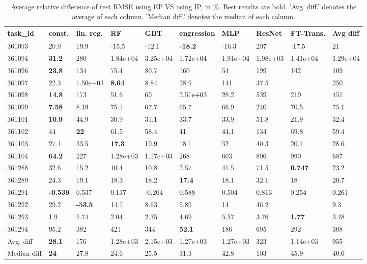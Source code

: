 \begin{table}[ht!]
\centering
\begingroup\footnotesize
\begin{tabular}{llllllllll}
  \hline
\hline
task\_id & const. & lin. reg. & RF & GBT & engression & MLP & ResNet & FT-Trans. & Avg diff \\ 
  \hline
361093 & 20.9 & 19.9 & -15.5 & -12.1 & \textbf{-18.2} & -16.3 & 207 & -17.5 & 21 \\ 
  361094 & \textbf{31.2} & 280 & 1.84e+04 & 3.25e+04 & 1.72e+04 & 1.91e+04 & 1.98e+03 & 1.41e+04 & 1.29e+04 \\ 
  361096 & \textbf{23.8} & 134 & 75.4 & 80.7 & 160 & 54 & 199 & 142 & 109 \\ 
  361097 & 22.3 & 1.50e+03 & \textbf{8.64} & 8.84 & 28.9 & 141 & 37.5 &  & 250 \\ 
  361098 & \textbf{14.8} & 173 & 51.6 & 69 & 2.51e+03 & 28.2 & 539 & 219 & 451 \\ 
  361099 & \textbf{7.58} & 8.19 & 75.1 & 67.7 & 65.7 & 66.9 & 240 & 70.5 & 75.1 \\ 
  361101 & \textbf{10.9} & 44.9 & 30.9 & 31.1 & 33.7 & 33.9 & 51.8 & 21.9 & 32.4 \\ 
  361102 & 44 & \textbf{22} & 61.5 & 58.4 & 41 & 44.1 & 134 & 69.8 & 59.4 \\ 
  361103 & 27.1 & 33.5 & \textbf{17.3} & 19.9 & 18.1 & 52 & 40.3 & 20.7 & 28.6 \\ 
  361104 & \textbf{64.2} & 227 & 1.28e+03 & 1.17e+03 & 268 & 603 & 896 & 990 & 687 \\ 
  361288 & 32.6 & 15.2 & 10.4 & 10.8 & 2.57 & 41.5 & 71.5 & \textbf{0.747} & 23.2 \\ 
  361289 & 24.3 & 19.1 & 18.3 & 18.2 & \textbf{17.4} & 18.1 & 32.1 & 18 & 20.7 \\ 
  361291 & \textbf{-0.539} & 0.537 & 0.137 & -0.204 & 0.588 & 0.504 & 0.813 & 0.254 & 0.261 \\ 
  361292 & 29.2 & \textbf{-53.5} & 14.7 & 8.63 & 5.89 & 14 & 46.2 &  & 9.3 \\ 
  361293 & 1.9 & 5.74 & 2.04 & 2.35 & 4.69 & 5.57 & 3.76 & \textbf{1.77} & 3.48 \\ 
  361294 & 95.2 & 382 & 421 & 344 & \textbf{52.1} & 186 & 695 & 292 & 308 \\ 
   \hline
Avg. diff & \textbf{28.1} & 176 & 1.28e+03 & 2.15e+03 & 1.27e+03 & 1.27e+03 & 323 & 1.14e+03 & 955 \\ 
  Median diff & \textbf{24} & 27.8 & 24.6 & 25.5 & 31.3 & 42.8 & 103 & 45.9 & 40.6 \\ 
   \hline
\hline
\end{tabular}
\endgroup
\caption{Average relative difference of test RMSE using EP VS using IP, in \%. 
                  Best results are bold. 
                  'Avg. diff.' denotes the average of each column.
                  'Median diff.' denotes the median of each column.} 
\label{TABLES/table_results_RMSE_gower_num_and_cat_features_EP_VS_IP}
\end{table}
